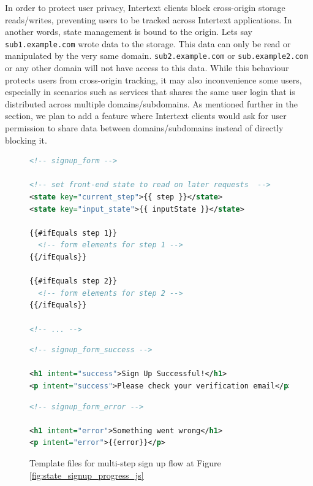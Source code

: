 In order to protect user privacy, Intertext clients block cross-origin storage reads/writes, preventing users to be tracked across Intertext applications. In another words, state management is bound to the origin. Lets say \texttt{sub1.example.com} wrote data to the storage. This data can only be read or manipulated by the very same domain. \texttt{sub2.example.com} or \newline\texttt{sub.example2.com} or any other domain will not have access to this data. While this behaviour protects users from cross-origin tracking, it may also inconvenience some users, especially in scenarios such as services that shares the same user login that is distributed across multiple domains/subdomains. As mentioned further in the  section, we plan to add a feature where Intertext clients would ask for user permission to share data between domains/subdomains instead of directly blocking it.

\begin{figure}
\begin{minipage}{\linewidth}
\begin{lstlisting}[language=xml]
<!-- signup_form -->

<!-- set front-end state to read on later requests  -->
<state key="current_step">{{ step }}</state>
<state key="input_state">{{ inputState }}</state>

{{#ifEquals step 1}}
  <!-- form elements for step 1 -->
{{/ifEquals}}

{{#ifEquals step 2}}
  <!-- form elements for step 2 -->
{{/ifEquals}}

<!-- ... -->
\end{lstlisting}

\begin{lstlisting}[language=xml]
<!-- signup_form_success -->

<h1 intent="success">Sign Up Successful!</h1>
<p intent="success">Please check your verification email</p>
\end{lstlisting}

\begin{lstlisting}[language=xml]
<!-- signup_form_error -->

<h1 intent="error">Something went wrong</h1>
<p intent="error">{{error}}</p>
\end{lstlisting}

\end{minipage}
\caption{Template files for multi-step sign up flow at Figure \ref{fig:state_signup_progress_js}}%
\label{fig:state_signup_progress_xml}%
\end{figure}
